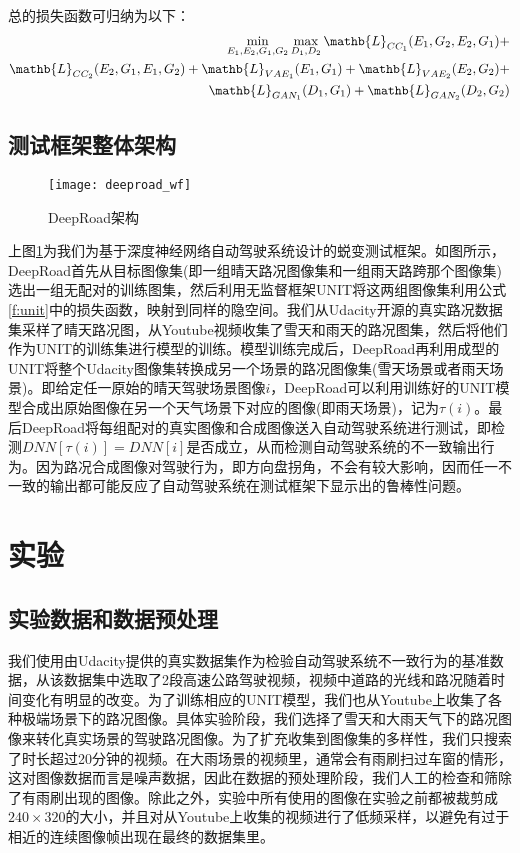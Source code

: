 总的损失函数可归纳为以下：
\begin{equation}
\begin{aligned}
    \min_{E_1,E_2,G_1,G_2}\max_{D_1,D_2}\mathb{L}_{CC_1}(E_1,G_2,E_2,G_1)+ \\ 
    \mathb{L}_{CC_2}(E_2,G_1,E_1,G_2) + \mathb{L}_{VAE_1}(E_1,G_1)+\mathb{L}_{VAE_2}(E_2,G_2)+ \\
    \mathb{L}_{GAN_1}(D_1,G_1) + \mathb{L}_{GAN_2}(D_2,G_2)
    \label{f:unit}
\end{aligned}
\end{equation}

\subsection{测试框架整体架构}

\begin{figure}[h]
    \centering
    \texttt{[image: deeproad\_wf]}
    \caption{DeepRoad架构}
    \label{dp-wf}
\end{figure}

上图\ref{dp-wf}为我们为基于深度神经网络自动驾驶系统设计的蜕变测试框架。如图所示，DeepRoad首先从目标图像集(即一组晴天路况图像集和一组雨天路跨那个图像集)选出一组无配对的训练图集，然后利用无监督框架UNIT将这两组图像集利用公式\ref{f:unit}中的损失函数，映射到同样的隐空间。我们从Udacity开源的真实路况数据集\cite{udacity_dataset}采样了晴天路况图，从Youtube视频收集了雪天和雨天的路况图集，然后将他们作为UNIT的训练集进行模型的训练。模型训练完成后，DeepRoad再利用成型的UNIT将整个Udacity图像集转换成另一个场景的路况图像集(雪天场景或者雨天场景)。即给定任一原始的晴天驾驶场景图像$i$，DeepRoad可以利用训练好的UNIT模型合成出原始图像在另一个天气场景下对应的图像(即雨天场景)，记为$\tau(i)$。最后DeepRoad将每组配对的真实图像和合成图像送入自动驾驶系统进行测试，即检测$DNN[\tau(i)]=DNN[i]$是否成立，从而检测自动驾驶系统的不一致输出行为。因为路况合成图像对驾驶行为，即方向盘拐角，不会有较大影响，因而任一不一致的输出都可能反应了自动驾驶系统在测试框架下显示出的鲁棒性问题。

\section{实验}

\subsection{实验数据和数据预处理}

我们使用由Udacity提供的真实数据集作为检验自动驾驶系统不一致行为的基准数据，从该数据集中选取了2段高速公路驾驶视频，视频中道路的光线和路况随着时间变化有明显的改变。为了训练相应的UNIT模型，我们也从Youtube上收集了各种极端场景下的路况图像。具体实验阶段，我们选择了雪天和大雨天气下的路况图像来转化真实场景的驾驶路况图像。为了扩充收集到图像集的多样性，我们只搜索了时长超过20分钟的视频。在大雨场景的视频里，通常会有雨刷扫过车窗的情形，这对图像数据而言是噪声数据，因此在数据的预处理阶段，我们人工的检查和筛除了有雨刷出现的图像。除此之外，实验中所有使用的图像在实验之前都被裁剪成$240\times 320$的大小，并且对从Youtube上收集的视频进行了低频采样，以避免有过于相近的连续图像帧出现在最终的数据集里。


